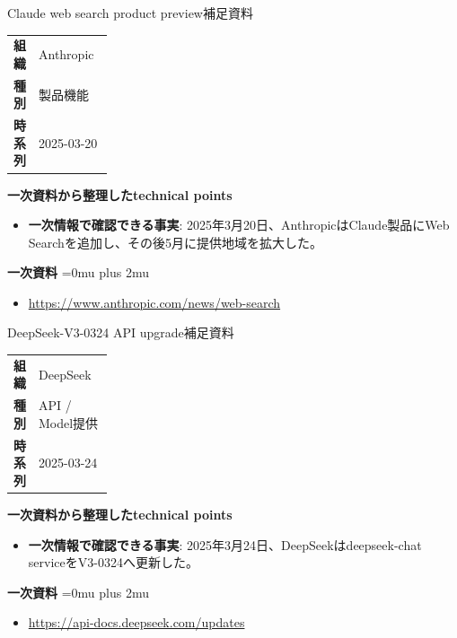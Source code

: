 \begin{technicalnote}{Claude web search product preview}{補足資料}
\begingroup
\begin{tabularx}{\linewidth}{@{}>{\bfseries}p{0.22\linewidth}X@{}}
組織 & Anthropic \\
種別 & 製品機能 \\
時系列 & 2025-03-20 \\
\end{tabularx}
\smallskip
\begin{minipage}{\linewidth}
{\bfseries 一次資料から整理したtechnical points}
\begin{itemize}[leftmargin=1.5em,itemsep=0.35em]
\item \textbf{一次情報で確認できる事実}: 2025年3月20日、AnthropicはClaude製品にWeb Searchを追加し、その後5月に提供地域を拡大した。
\end{itemize}
\begin{samepage}
{\bfseries 一次資料}
\begingroup\sloppy
\Urlmuskip=0mu plus 2mu\relax
\begin{itemize}[leftmargin=1.5em,itemsep=0.25em]
\item {\scriptsize\url{https://www.anthropic.com/news/web-search}}
\end{itemize}
\endgroup
\end{samepage}
\end{minipage}
\endgroup
\end{technicalnote}
\medskip

\begin{technicalnote}{DeepSeek-V3-0324 API upgrade}{補足資料}
\begingroup
\begin{tabularx}{\linewidth}{@{}>{\bfseries}p{0.22\linewidth}X@{}}
組織 & DeepSeek \\
種別 & API / Model提供 \\
時系列 & 2025-03-24 \\
\end{tabularx}
\smallskip
\begin{minipage}{\linewidth}
{\bfseries 一次資料から整理したtechnical points}
\begin{itemize}[leftmargin=1.5em,itemsep=0.35em]
\item \textbf{一次情報で確認できる事実}: 2025年3月24日、DeepSeekはdeepseek-chat serviceをV3-0324へ更新した。
\end{itemize}
\begin{samepage}
{\bfseries 一次資料}
\begingroup\sloppy
\Urlmuskip=0mu plus 2mu\relax
\begin{itemize}[leftmargin=1.5em,itemsep=0.25em]
\item {\scriptsize\url{https://api-docs.deepseek.com/updates}}
\end{itemize}
\endgroup
\end{samepage}
\end{minipage}
\endgroup
\end{technicalnote}
\medskip

